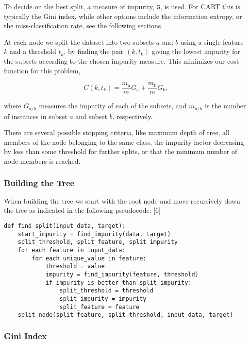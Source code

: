 \documentclass[11pt]{article}
\begin{document}
To decide on the best split, a measure of impurity, \(\texttt{G}\), is
used. For CART this is typically the Gini index, while other options
include the information entropy, or the miss-classification rate, see the
following sections.

At each node we split the dataset into two subsets \(a\) and \(b\) using
a single feature \(k\) and a threshold \(t_k\), by finding the pair
\((k,t_k)\) giving the lowest impurity for the subsets according to the
chosen impurity measure. This minimizes our cost function for this
problem,

    \[
C(k,t_k) = \frac{m_{\mathrm{a}}}{m}G_{\mathrm{a}}+ \frac{m_{\mathrm{b}}}{m}G_{\mathrm{b}},
\]

    where \(G_{\mathrm{a/b}}\) measures the impurity of each of the subsets,
and \(m_{\mathrm{a/b}}\) is the number of instances in subset \(a\) and
subset \(b\), respectively.

There are several possible stopping criteria, like maximum depth of
tree, all members of the node belonging to the same class, the impurity
factor decreasing by less than some threshold for further splits, or
that the minimum number of node members is reached.


\hypertarget{building-the-tree}{%
\subsubsection*{Building the Tree}\label{building-the-tree}} 

When building the tree we start with the root node and move recursively down the tree as indicated in the following pseudocode: {[}6{]}

\begin{verbatim}
def find_split(input_data, target):
    start_impurity = find_impurity(data, target)
    split_threshold, split_feature, split_impurity
    for each feature in input_data:
        for each unique_value in feature:
            threshold = value
            impurity = find_impurity(feature, threshold)
            if impurity is better than split_impurity:
                split_threshold = threshold
                split_impurity = impurity
                split_feature = feature
    split_node(split_feature, split_threshold, input_data, target)
\end{verbatim}

    \hypertarget{gini-index}{%
\subsubsection{Gini Index}\label{gini-index}}
\end{document}
